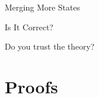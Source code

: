 \documentclass[aspectratio=169,compress,10pt]{beamer}
\begin{document}
\begin{frame}{Merging More States}
\end{frame}

\begin{frame}[t]{Is It Correct?}
    \begin{minipage}{0.4\paperwidth}
        Do you trust the theory?

        \bigskip

    \end{minipage}\hfill\begin{minipage}{0.4\paperwidth}%
    \end{minipage}
\end{frame}

\section{Proofs}
\end{document}
